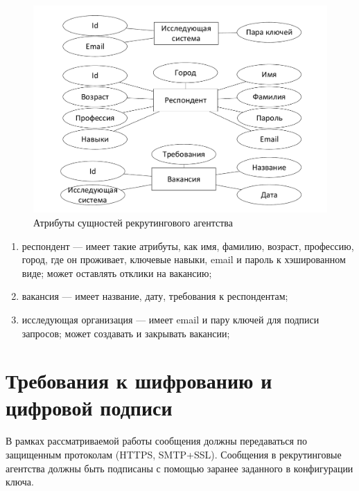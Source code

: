 \begin{figure}[ht]
  \centering
  \includegraphics[width=\textwidth]{include/er-recruiting-at.pdf}
\caption{Атрибуты сущностей рекрутингового агентства}
\label{fig:er-recruiting-at}
\end{figure}

\begin{enumerate}
\item респондент — имеет такие атрибуты, как имя, фамилию, возраст, профессию, город, где он проживает, ключевые навыки, email и пароль к хэшированном виде; может оставлять отклики на вакансию;
\item вакансия — имеет название, дату, требования к респондентам;
\item исследующая организация — имеет email и пару ключей для подписи запросов; может создавать и закрывать вакансии;
\end{enumerate}

\section{Требования к шифрованию и цифровой подписи}
В рамках рассматриваемой работы сообщения должны передаваться по защищенным протоколам (HTTPS, SMTP+SSL). Сообщения в рекрутинговые агентства должны быть подписаны с помощью заранее заданного в конфигурации ключа.

